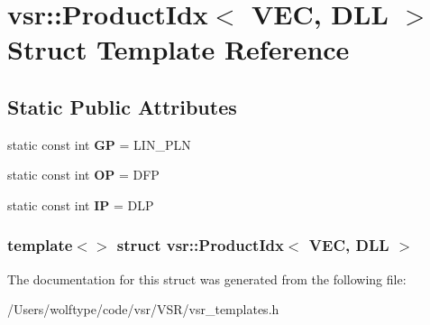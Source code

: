 \hypertarget{structvsr_1_1_product_idx_3_01_v_e_c_00_01_d_l_l_01_4}{\section{vsr\-:\-:Product\-Idx$<$ V\-E\-C, D\-L\-L $>$ Struct Template Reference}
\label{structvsr_1_1_product_idx_3_01_v_e_c_00_01_d_l_l_01_4}
}
\subsection*{Static Public Attributes}
\begin{DoxyCompactItemize}
\item 
\hypertarget{structvsr_1_1_product_idx_3_01_v_e_c_00_01_d_l_l_01_4_a5c21398c25214d4a1b15bb449506fb11}{static const int {\bfseries G\-P} = L\-I\-N\-\_\-\-P\-L\-N}\label{structvsr_1_1_product_idx_3_01_v_e_c_00_01_d_l_l_01_4_a5c21398c25214d4a1b15bb449506fb11}

\item 
\hypertarget{structvsr_1_1_product_idx_3_01_v_e_c_00_01_d_l_l_01_4_a7bacfdcbda779d4314290d4d51d2993e}{static const int {\bfseries O\-P} = D\-F\-P}\label{structvsr_1_1_product_idx_3_01_v_e_c_00_01_d_l_l_01_4_a7bacfdcbda779d4314290d4d51d2993e}

\item 
\hypertarget{structvsr_1_1_product_idx_3_01_v_e_c_00_01_d_l_l_01_4_a1feac6b794c5255d7154465269a109ee}{static const int {\bfseries I\-P} = D\-L\-P}\label{structvsr_1_1_product_idx_3_01_v_e_c_00_01_d_l_l_01_4_a1feac6b794c5255d7154465269a109ee}

\end{DoxyCompactItemize}
\subsubsection*{template$<$$>$ struct vsr\-::\-Product\-Idx$<$ V\-E\-C, D\-L\-L $>$}



The documentation for this struct was generated from the following file\-:\begin{DoxyCompactItemize}
\item 
/\-Users/wolftype/code/vsr/\-V\-S\-R/vsr\-\_\-templates.\-h\end{DoxyCompactItemize}
